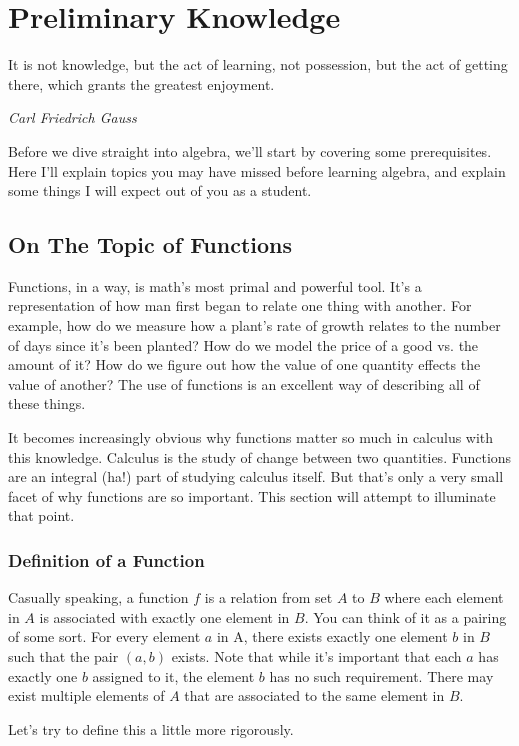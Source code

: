 \chapter{Preliminary Knowledge}
\epigraph{It is not knowledge, but the act of learning, not possession, but the act of getting there, which grants the greatest enjoyment.}{\textit{Carl Friedrich Gauss}}

Before we dive straight into algebra, we'll start by covering some prerequisites. Here I'll explain topics you may have missed before learning algebra, and explain some things I will expect out of you as a student. 

\section{On The Topic of Functions}

Functions, in a way, is math's most primal and powerful tool. It's a representation of how man first began to relate one thing with another. For example, how do we measure how a plant's rate of growth relates to the number of days since it's been planted? How do we model the price of a good vs. the amount of it? How do we figure out how the value of one quantity effects the value of another? The use of functions is an excellent way of describing all of these things. 

It becomes increasingly obvious why functions matter so much in calculus with this knowledge. Calculus is the study of change between two quantities. Functions are an integral (ha!) part of studying calculus itself. But that's only a very small facet of why functions are so important. This section will attempt to illuminate that point. 

\subsection{Definition of a Function}

Casually speaking, a function $f$ is a relation from set $A$ to $B$ where each element in $A$ is associated with exactly one element in $B$. You can think of it as a pairing of some sort. For every element $a$ in A, there exists exactly one element $b$ in $B$ such that the pair $(a, b)$ exists. Note that while it's important that each $a$ has exactly one $b$ assigned to it, the element $b$ has no such requirement. There may exist multiple elements of $A$ that are associated to the same element in $B$. 

Let's try to define this a little more rigorously. 

